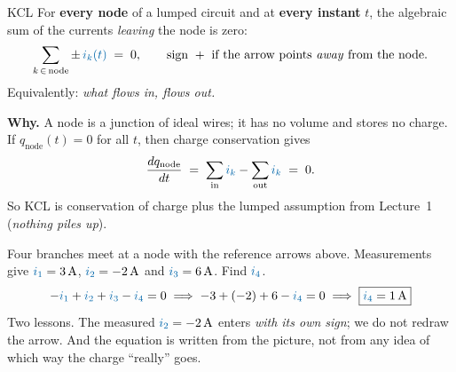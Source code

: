 \documentclass[11pt,a4paper]{article}
\newcommand{\Icol}[1]{\textcolor{ccur}{#1}}
\newcommand{\uni}[1]{\,\mathrm{#1}}
\newcommand{\A}{\uni{A}}   \newcommand{\V}{\uni{V}}
\begin{document}
\begin{definitionbox}{KCL}
For \textbf{every node} of a lumped circuit and at \textbf{every instant} $t$, the
algebraic sum of the currents \emph{leaving} the node is zero:
\[
  \sum_{k \,\in\, \text{node}} \pm\, \Icol{i_k(t)} \;=\; 0 ,
  \qquad
  \text{sign } + \text{ if the arrow points \emph{away} from the node.}
\]
Equivalently: \emph{what flows in, flows out.}
\end{definitionbox}

\textbf{Why.} A node is a junction of ideal wires; it has no volume and stores no charge.
If $q_{\text{node}}(t) = 0$ for all $t$, then charge conservation gives
\[
  \frac{dq_{\text{node}}}{dt} \;=\; \sum_{\text{in}} \Icol{i_k} - \sum_{\text{out}} \Icol{i_k} \;=\; 0 .
\]
So KCL is conservation of charge plus the lumped assumption from Lecture~1
(\emph{nothing piles up}).

\begin{center}
\end{center}

\begin{examplebox}
Four branches meet at a node with the reference arrows above. Measurements give
$\Icol{i_1} = 3\A$, $\Icol{i_2} = -2\A$ and $\Icol{i_3} = 6\A$. Find $\Icol{i_4}$.
\[
  -\Icol{i_1} + \Icol{i_2} + \Icol{i_3} - \Icol{i_4} = 0
  \;\Longrightarrow\;
  -3 + (-2) + 6 - \Icol{i_4} = 0
  \;\Longrightarrow\;
  \boxed{\Icol{i_4} = 1\A}
\]
Two lessons. The measured $\Icol{i_2} = -2\A$ enters \emph{with its own sign}; we do not
redraw the arrow. And the equation is written from the picture, not from any idea of which
way the charge ``really'' goes.
\end{examplebox}
\end{document}
